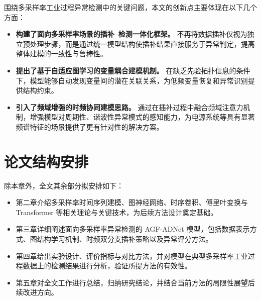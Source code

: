 围绕多采样率工业过程异常检测中的关键问题，本文的创新点主要体现在以下几个方面：

\begin{itemize}
    \item \textbf{构建了面向多采样率场景的插补--检测一体化框架。} 不再将数据插补仅视为独立预处理步骤，而是通过统一模型结构使插补结果直接服务于异常判定，提高整体建模的一致性与鲁棒性。
    \item \textbf{提出了基于自适应图学习的变量耦合建模机制。} 在缺乏先验拓扑信息的条件下，模型能够自动发现变量间的潜在关联关系，为低频变量恢复和异常识别提供结构约束。
    \item \textbf{引入了频域增强的时频协同建模思路。} 通过在插补过程中融合频域注意力机制，增强模型对周期性、谐波性异常模式的感知能力，为电源系统等具有显著频谱特征的场景提供了更有针对性的解决方案。
\end{itemize}

\section{论文结构安排}

除本章外，全文其余部分拟安排如下：

\begin{itemize}
    \item 第二章介绍多采样率时间序列建模、图神经网络、时序卷积、傅里叶变换与 Transformer 等相关理论与关键技术，为后续方法设计奠定基础。
    \item 第三章详细阐述面向多采样率异常检测的 AGF-ADNet 模型，包括数据表示方式、图结构学习机制、时频双分支插补策略以及异常评分方法。
    \item 第四章给出实验设计、评价指标与对比方法，并对模型在典型多采样率工业过程数据上的检测结果进行分析，验证所提方法的有效性。
    \item 第五章对全文工作进行总结，归纳研究结论，并结合当前方法的局限性展望后续改进方向。
\end{itemize}
